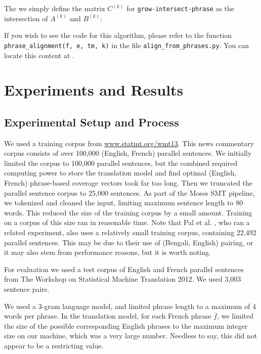 \documentclass[twocolumn]{article}
\newcommand{\phraseIntersectAlign}{\texttt{grow-intersect-phrase}}
\begin{document}
The we simply define the matrix $C^{(k)}$ for \phraseIntersectAlign{}
as the intersection of $A^{(k)}$ and $B^{(k)}$:
\wrapSmall{\intersectMatrix{}}

If you wish to see the code for this algorithm, please refer to
the function \verb!phrase_alignment(f, e, tm, k)!
in the file \verb!align_from_phrases.py!.
You can locate this content at
\href{https://github.com/dbmikus/11-731.phrase-matrix-aligner}
     {}.

\section{Experiments and Results}
\subsection{Experimental Setup and Process}
We used a training corpus from
\href{http://www.statmt.org/wmt13/training-parallel-nc-v8.tgz}
     {\underline{www.statmt.org/wmt13}}.
This news commentary corpus consists of over 100,000 (English, French) parallel
sentences.
We initially limited the corpus to 100,000 parallel sentences, but the
combined required computing power to store the translation model and find
optimal (English, French) phrase-based coverage vectors took far too long.
Then we truncated the parallel sentence corpus to 25,000 sentences.
As part of the Moses SMT pipeline, we tokenized and cleaned the input, limiting
maximum sentence length to 80 words. This reduced the size of the training
corpus by a small amount.
Training on a corpus of this size ran in reasonable time. Note that
Pal et al. \cite{pnb2013},
who ran a related experiment, also uses a relatively small training corpus,
containing 22,492 parallel sentences. This may be due to their use of (Bengali,
English) pairing, or it may also stem from performance reasons, but it is worth
noting.

For evaluation we used a test corpus of English and French parallel sentences
from The Workshop on Statistical Machine Translation 2012. We used 3,003
sentence pairs.

We used a 3-gram language model, and limited phrase length to a maximum of 4
words per phrase. In the translation model,
for each French phrase $\overline{f}$, we
limited the size of the possible corresponding English phrases to the maximum
integer size on our machine, which was a very large number. Needless to say,
this did not appear to be a restricting value.
\end{document}
